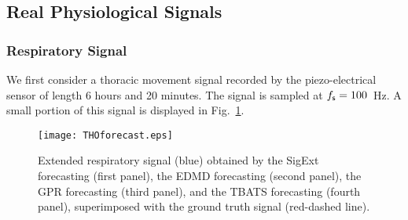 \subsection{Real Physiological Signals}
\label{sse:physio.sig}


\subsubsection{Respiratory Signal}
We first consider a thoracic movement signal recorded by the piezo-electrical sensor of length 6 hours and 20 minutes. The signal is sampled at $f_{\mathsf s}=100$~Hz. A small portion of this signal is displayed in Fig.~\ref{fig:tho}.

\begin{figure}
\texttt{[image: THOforecast.eps]}
\caption{Extended respiratory signal (blue) obtained by the {\sf SigExt} forecasting (first panel), the EDMD forecasting (second panel), the GPR forecasting (third panel), and the TBATS forecasting (fourth panel), superimposed with the ground truth signal (red-dashed line).}
\label{fig:tho}
\end{figure}

